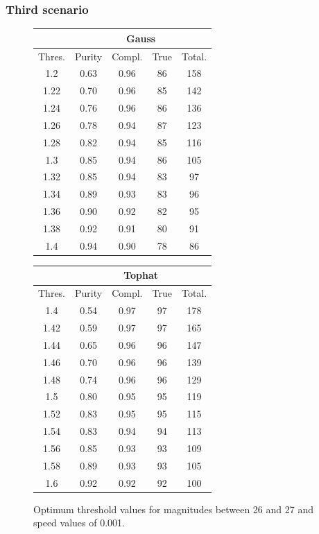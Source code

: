 \documentclass{article}
\begin{document}
\subsubsection{Third scenario}
\begin{figure}[H]
\centering
\begin{tabular}{|c|c|c|c|c|}
\hline
\multicolumn{1}{|c|}{} & \multicolumn{4}{c|}{Gauss} \\
\hline \hline
Thres. & Purity & Compl. & True & Total.\\
\hline
1.2 & 0.63 & 0.96 & 86 & 158\\
\hline
1.22 & 0.70 & 0.96 & 85 & 142\\
\hline
1.24 & 0.76 & 0.96 & 86 & 136\\
\hline
1.26 & 0.78 & 0.94 & 87 & 123\\
\hline
1.28 & 0.82 & 0.94 & 85 & 116\\
\hline
1.3 & 0.85 & 0.94 & 86 & 105\\
\hline
1.32 & 0.85 & 0.94 & 83 & 97\\
\hline
1.34 & 0.89 & 0.93 & 83 & 96\\
\hline
1.36 & 0.90 & 0.92 & 82 & 95\\
\hline
1.38 & 0.92 & 0.91 & 80 & 91\\
\hline
1.4 & 0.94 & 0.90 & 78 & 86\\
\hline
\end{tabular}
\qquad
\begin{tabular}{|c|c|c|c|c|}
\hline
\multicolumn{1}{|c|}{} & \multicolumn{4}{c|}{Tophat} \\
\hline \hline
Thres. & Purity & Compl. & True & Total.\\
\hline
1.4 & 0.54 & 0.97 & 97 & 178\\
\hline
1.42 & 0.59 & 0.97 & 97 & 165\\
\hline
1.44 & 0.65 & 0.96 & 96 & 147\\
\hline
1.46 & 0.70 & 0.96 & 96 & 139\\
\hline
1.48 & 0.74 & 0.96 & 96 & 129\\
\hline
1.5 & 0.80 & 0.95 & 95 & 119\\
\hline
1.52 & 0.83 & 0.95 & 95 & 115\\
\hline
1.54 & 0.83 & 0.94 & 94 & 113\\
\hline
1.56 & 0.85 & 0.93 & 93 & 109\\
\hline
1.58 & 0.89 & 0.93 & 93 & 105\\
\hline
1.6 & 0.92 & 0.92 & 92 & 100\\
\hline
\end{tabular}
\captionsetup{labelformat=andtable}
\caption{Optimum threshold values for magnitudes between 26 and 27 and speed values of 0.001.}
\end{figure}
\end{document}
